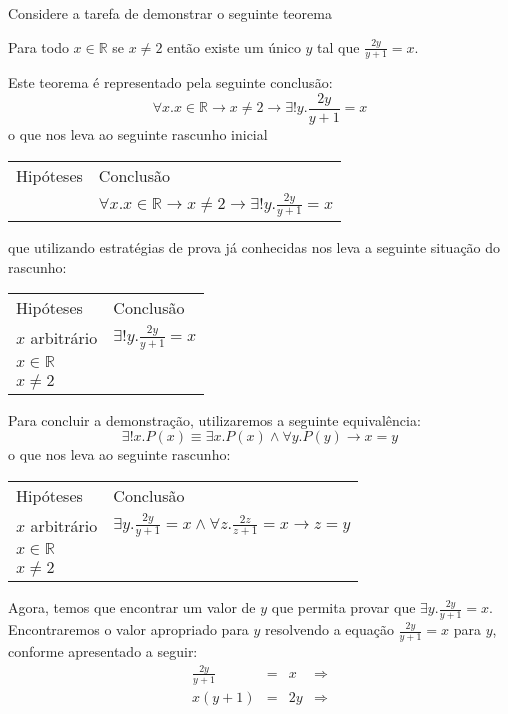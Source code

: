 \begin{Example}
Considere a tarefa de demonstrar o seguinte teorema
\begin{flushleft}
Para todo $x\in\mathbb{R}$ se $x \neq 2$ então existe um único $y$ tal
que $\frac{2y}{y+ 1} = x$.
\end{flushleft}
Este teorema é representado pela seguinte conclusão:
\[
\forall x. x\in\mathbb{R} \to x \neq 2 \to \exists ! y . \frac{2y}{y +
1} = x
\]
o que nos leva ao seguinte rascunho inicial
\begin{flushleft}
\begin{tabular}{ll}
Hipóteses & Conclusão \\
 & $\forall x. x\in\mathbb{R} \to x \neq 2 \to \exists ! y . \frac{2y}{y +
1} = x
$
\end{tabular}
\end{flushleft}
que utilizando estratégias de prova já conhecidas nos leva a seguinte
situação do rascunho:
\begin{flushleft}
\begin{tabular}{ll}
Hipóteses & Conclusão \\
$x$ arbitrário &  $\exists ! y . \frac{2y}{y +
1} = x$ \\
$x\in\mathbb{R}$ & \\
$x\neq 2$ & \\
\end{tabular}
\end{flushleft}
Para concluir a demonstração, utilizaremos a seguinte equivalência:
\[
\exists ! x. P(x) \equiv \exists x.P(x) \land \forall y. P(y) \to x = y
\]
o que nos leva ao seguinte rascunho:
\begin{flushleft}
\begin{tabular}{ll}
Hipóteses & Conclusão \\
$x$ arbitrário &  $\exists y . \frac{2y}{y +
1} = x \land \forall z. \frac{2z}{z+1} = x \to z = y$ \\
$x\in\mathbb{R}$ & \\
$x\neq 2$ & \\
\end{tabular}
\end{flushleft}
Agora, temos que encontrar um valor de $y$ que permita provar que
$\exists y. \frac{2y}{y+1} = x$. Encontraremos o valor apropriado para
$y$ resolvendo a equação $\frac{2y}{y+1} = x$ para $y$, conforme
apresentado a seguir:
\[
\begin{array}{lclc}
\frac{2y}{y + 1} & = & x & \Rightarrow\\
x(y + 1) & = & 2y & \Rightarrow\\

\end{array}\]
\end{Example}
